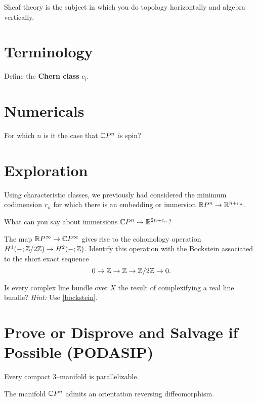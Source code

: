 \documentclass{homework}
\author{Jim Fowler}
\begin{document}
\maketitle

\begin{inspiration}
  Sheaf theory is the subject in which you do topology horizontally and algebra vertically.
\end{inspiration}

\section{Terminology}

\begin{problem}
  Define the \textbf{Chern class} $c_i$.
\end{problem}

\section{Numericals}

\begin{problem}
For which $n$ is it the case that $\mathbb{C}P^n$ is spin?
\end{problem}

\section{Exploration}

\begin{problem}
  Using characteristic classes, we previously had considered the
  minimum codimension $r_n$ for which there is an embedding or
  immersion $\mathbb{R}P^n \to \mathbb{R}^{n + r_n}$.

  What can you say about immersions $\mathbb{C}P^n \to \mathbb{R}^{2n + c_n}$?
\end{problem}

\begin{problem}\label{bockstein}
  The map $\mathbb{R}P^\infty \to \mathbb{C}P^\infty$ gives rise to the cohomology operation $H^1(-;\mathbb{Z}/2\mathbb{Z}) \to H^2(-;\mathbb{Z})$.  Identify this operation with the Bockstein associated to the short exact sequence \[
    0 \to \mathbb{Z} \to \mathbb{Z} \to \mathbb{Z}/2\mathbb{Z} \to 0.
  \]
\end{problem}

\begin{problem}
Is every complex line bundle over $X$ the result of complexifying a real line bundle?  \textit{Hint:} Use \ref{bockstein}.
\end{problem}

\section{Prove or Disprove and Salvage if Possible (PODASIP)}

\begin{problem} %
  Every compact 3–manifold is parallelizable.
\end{problem}

\begin{problem} %
  The manifold $\mathbb{C}P^n$ admits an orientation reversing diffeomorphism.
\end{problem}
\end{document}
